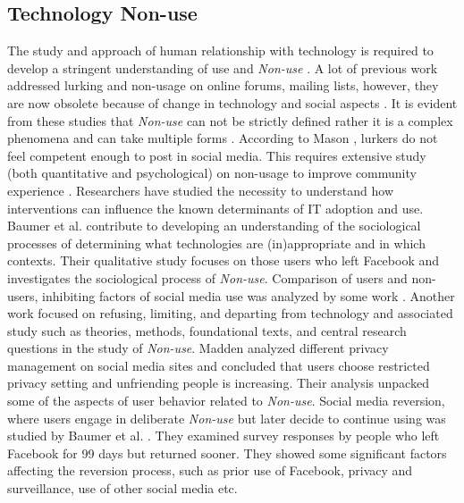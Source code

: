 \subsection{Technology Non-use}
The study and approach of human relationship with technology is required to develop a stringent understanding of use and \emph{Non-use} \cite{ baumer2015study}. A lot of previous work addressed lurking and non-usage \cite{ames2013managing, crawford2009following, portwood2013media} on online forums, mailing lists, however, they are now obsolete because of change in technology and social aspects \cite{nonnecke2001lurkers}. It is evident from these studies that \emph{Non-use} can not be strictly defined rather it is a complex phenomena and can take multiple forms \cite{baumer2015importance}. According to Mason \cite{mason1999issues}, lurkers do not feel competent enough to post in social media. This requires extensive study (both quantitative and psychological) on non-usage to improve community experience \cite{preece2004top, schultz2004lurkers}.  Researchers have studied the necessity to understand how interventions can influence the known determinants of IT adoption and use. Baumer et al. \cite{baumer2013limiting} contribute to developing an understanding of the sociological processes of determining what technologies are
(in)appropriate and in which contexts. Their qualitative study focuses on those users who left Facebook and investigates the sociological process of \textit{Non-use}. Comparison of users and non-users, inhibiting factors of social media use was analyzed by some work \cite{hargittai2007whose, ryan2011uses,warschauer2004technology}. Another work \cite{baumer2014refusing} focused on refusing, limiting, and departing from technology and associated study such as theories, methods, foundational texts, and central research questions in the study of \textit{Non-use}. Madden \cite{madden2012privacy} analyzed different privacy management on social media sites and concluded that users choose restricted privacy setting and unfriending people is increasing. Their analysis unpacked some of the aspects of user behavior related to \textit{Non-use}. Social media reversion, where users engage in deliberate \emph{Non-use} but later decide to continue using was studied by Baumer et al. \cite{baumer2015missing}. They examined survey responses by people who left Facebook for 99 days but returned sooner. They showed some significant factors affecting the reversion process, such as prior use of Facebook, privacy and surveillance, use of other social media etc. 

